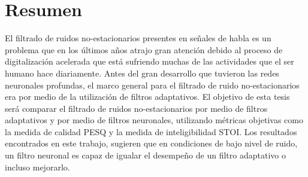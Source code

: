 \section*{\hfil Resumen \hfil}

\noindent El filtrado de ruidos no-estacionarios presentes en señales de habla es un problema que en los últimos años atrajo gran atención debido al proceso de digitalización acelerada que está sufriendo muchas de las actividades que el ser humano hace diariamente. Antes del gran desarrollo que tuvieron las redes neuronales profundas, el marco general para el filtrado de ruido no-estacionarios era por medio de la utilización de filtros adaptativos. El objetivo de esta tesis será comparar el filtrado de ruidos no-estacionarios por medio de filtros adaptativos y por medio de filtros neuronales, utilizando métricas objetivas como la medida de calidad PESQ y la medida de inteligibilidad STOI. Los resultados encontrados en este trabajo, sugieren que en condiciones de bajo nivel de ruido, un filtro neuronal es capaz de igualar el desempeño de un filtro adaptativo o incluso mejorarlo.
